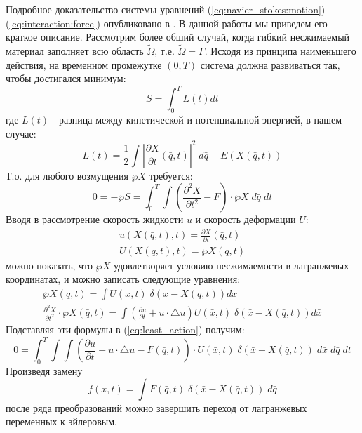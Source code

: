 Подробное доказательство системы уравнений (\ref{eq:navier_stokes:motion}) - (\ref{eq:interaction:force}) опубликовано в \cite{peskin2002immersed}.
В данной работы мы приведем его краткое описание. Рассмотрим более обший случай,
когда гибкий несжимаемый материал заполняет всю область $\tilde{\Omega}$, т.е. $\tilde{\Omega} = \Gamma$.
Исходя из принципа наименьшего действия, на временном промежутке $(0, T)$ система должна развиваться так, чтобы достигался минимум:
\begin{equation}
    S = \int_0^T L(t) dt
\end{equation}
где $L(t)$ - разница между кинетической и потенциальной энергией, в нашем случае:
\begin{equation}
    \label{eq:least_action}
    L(t) = \frac{1}{2} \int \left| \frac{\partial X}{\partial t}(\bar{q}, t) \right|^2 \; d\bar{q} - E(X(\bar{q}, t))
\end{equation}
Т.о. для любого возмущения $\wp X$ требуется:
\begin{equation}
    0 = -\wp S = \int_0^T \int \left( \frac{\partial^2 X}{\partial t^2} - F \right) \cdot \wp X \; d\bar{q} \; dt
\end{equation}
Вводя в рассмотрение скорость жидкости $u$ и скорость деформации $U$:
\begin{gather}
    u(X(\bar{q}, t), t) = \frac{\partial X}{\partial t}(\bar{q}, t) \\
    U(X(\bar{q}, t), t) = \wp X(\bar{q}, t)
\end{gather}
можно показать, что $\wp X$ удовлетворяет условию несжимаемости в лагранжевых координатах, и можно записать следующие уравнения:
\begin{gather}
    \wp X(\bar{q}, t) = \int U(\bar{x}, t) \; \delta(\bar{x} - X(\bar{q}, t)) d\bar{x} \\
    \frac{\partial^2 X}{\partial t^2} \cdot \wp X(\bar{q}, t) = \int  \left(\frac{\partial u}{\partial t} + u \cdot \triangle u \right) U(\bar{x}, t) \; \delta(\bar{x} - X(\bar{q}, t)) d\bar{x}
\end{gather}
Подставляя эти формулы в (\ref{eq:least_action}) получим:
\begin{equation}
    0 = \int_0^T \int \int \left( \frac{\partial u}{\partial t} + u \cdot \triangle u - F(\bar{q}, t) \right) \cdot U(\bar{x}, t) \; \delta(\bar{x} - X(\bar{q}, t)) \; d\bar{x} \; d\bar{q} \; dt
\end{equation}
Произведя замену
\begin{equation}
    f(x, t) = \int F(\bar{q}, t) \; \delta(\bar{x} - X(\bar{q}, t)) \; d\bar{q}
\end{equation}
после ряда преобразований можно завершить переход от лагранжевых переменных к эйлеровым.

